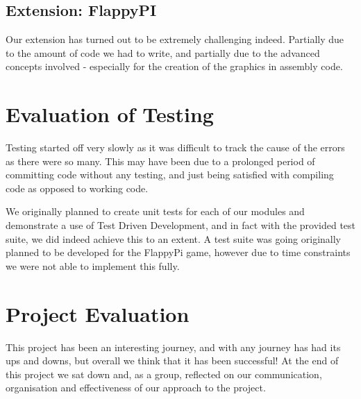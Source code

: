 \documentclass[11pt]{article}
\begin{document}
\subsection{Extension: FlappyPI}
Our extension has turned out to be extremely challenging indeed. Partially due to the amount of code we had to write, and partially due to the advanced concepts involved - especially for the creation of the graphics in assembly code.




\section{Evaluation of Testing}
Testing started off very slowly as it was difficult to track the cause of the errors as there were so many. This may have been due to a prolonged period of committing code without any testing, and just being satisfied with compiling code as opposed to working code.


We originally planned to create unit tests for each of our modules and demonstrate a use of Test Driven Development, and in fact with the provided test suite, we did indeed achieve this to an extent. A test suite was going originally planned to be developed for the FlappyPi game, however due to time constraints we were not able to implement this fully.



\section{Project Evaluation}
This project has been an interesting journey, and with any journey has had its ups and downs, but overall we think that it has been successful! At the end of this project we sat down and, as a group, reflected on our communication, organisation and effectiveness of our approach to the project.
\end{document}

